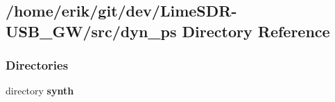 \subsection{/home/erik/git/dev/\+Lime\+S\+D\+R-\/\+U\+S\+B\+\_\+\+G\+W/src/dyn\+\_\+ps Directory Reference}
\label{dir_2af5c8a194dce1690ca6a0ac5013acab}
\subsubsection*{Directories}
\begin{DoxyCompactItemize}
\item 
directory {\bf synth}
\end{DoxyCompactItemize}
